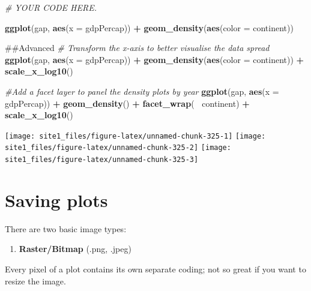 \documentclass[]{book}
\newenvironment{Shaded}{\begin{snugshade}}{\end{snugshade}}
\newcommand{\KeywordTok}[1]{\textcolor[rgb]{0.13,0.29,0.53}{\textbf{#1}}}
\newcommand{\DataTypeTok}[1]{\textcolor[rgb]{0.13,0.29,0.53}{#1}}
\newcommand{\StringTok}[1]{\textcolor[rgb]{0.31,0.60,0.02}{#1}}
\newcommand{\CommentTok}[1]{\textcolor[rgb]{0.56,0.35,0.01}{\textit{#1}}}
\newcommand{\OperatorTok}[1]{\textcolor[rgb]{0.81,0.36,0.00}{\textbf{#1}}}
\newcommand{\NormalTok}[1]{#1}
\providecommand{\tightlist}{%
  \setlength{\itemsep}{0pt}\setlength{\parskip}{0pt}}
\begin{document}
\begin{Shaded}
\begin{Highlighting}[]
\CommentTok{# YOUR CODE HERE.}

\KeywordTok{ggplot}\NormalTok{(gap, }\KeywordTok{aes}\NormalTok{(}\DataTypeTok{x =}\NormalTok{ gdpPercap)) }\OperatorTok{+}
\StringTok{  }\KeywordTok{geom_density}\NormalTok{(}\KeywordTok{aes}\NormalTok{(}\DataTypeTok{color =}\NormalTok{ continent))}

\NormalTok{##Advanced}
\CommentTok{# Transform the x-axis to better visualise the data spread}
\KeywordTok{ggplot}\NormalTok{(gap, }\KeywordTok{aes}\NormalTok{(}\DataTypeTok{x =}\NormalTok{ gdpPercap)) }\OperatorTok{+}
\StringTok{  }\KeywordTok{geom_density}\NormalTok{(}\KeywordTok{aes}\NormalTok{(}\DataTypeTok{color =}\NormalTok{ continent)) }\OperatorTok{+}
\StringTok{  }\KeywordTok{scale_x_log10}\NormalTok{()}

\CommentTok{#Add a facet layer to panel the density plots by year}
\KeywordTok{ggplot}\NormalTok{(gap, }\KeywordTok{aes}\NormalTok{(}\DataTypeTok{x =}\NormalTok{ gdpPercap)) }\OperatorTok{+}
\StringTok{  }\KeywordTok{geom_density}\NormalTok{() }\OperatorTok{+}
\StringTok{  }\KeywordTok{facet_wrap}\NormalTok{(}\OperatorTok{~}\StringTok{ }\NormalTok{continent) }\OperatorTok{+}
\StringTok{  }\KeywordTok{scale_x_log10}\NormalTok{()}
\end{Highlighting}
\end{Shaded}

\begin{center}\texttt{[image: site1\_files/figure-latex/unnamed-chunk-325-1]} \texttt{[image: site1\_files/figure-latex/unnamed-chunk-325-2]} \texttt{[image: site1\_files/figure-latex/unnamed-chunk-325-3]} \end{center}

\section{Saving plots}\label{saving-plots}

There are two basic image types:

\begin{enumerate}
\def\labelenumi{\arabic{enumi})}
\tightlist
\item
  \textbf{Raster/Bitmap} (.png, .jpeg)
\end{enumerate}

Every pixel of a plot contains its own separate coding; not so great if
you want to resize the image.
\end{document}
